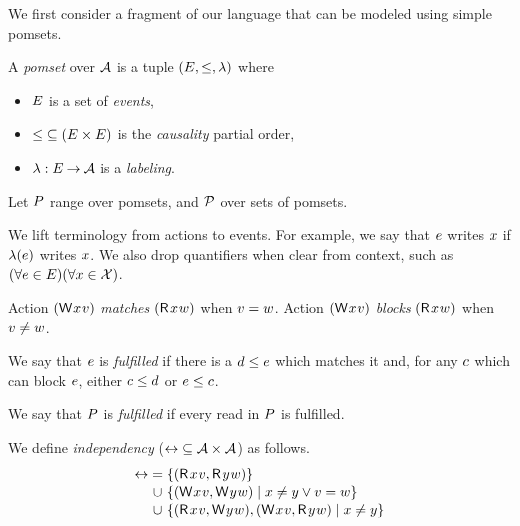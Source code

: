 We first consider a fragment of our language that can be modeled using simple
pomsets.
\begin{definition}
  A \emph{pomset} over $\mathcal{A}$ is a tuple
  $(E, {\le}, \lambda)$ where
  \begin{itemize}
  \item $E$ is a set of \emph{events},
  \item
    ${\le} \subseteq (E\times E)$ is the \emph{causality} partial order, 
  \item
    $\lambda: E \mathbin\rightarrow \mathcal{A}$ is a \emph{labeling}.
  \end{itemize}
\end{definition}
Let $P$ range over pomsets, and $\mathcal{P}$ over sets of pomsets.

We lift terminology from actions to events.  For example, we say that $e$
writes $x$ if $\lambda(e)$ writes $x$.  We also drop quantifiers
when clear from context, such as
$(\forall e\in E)(\forall x\in\mathcal{X})$.

\begin{definition}
  Action $\DWP{\aLoc}{\aVal}$ \emph{matches} $\DRP{\aLoc}{\bVal}$ when $v=w$.
  Action $\DWP{\aLoc}{\aVal}$ \emph{blocks} $\DRP{\aLoc}{\bVal}$ when $v\neq w$.
  

  We say that $e$ is \emph{fulfilled} if there is a $d\le e$ which
  matches it and, for any $c$ which can block $e$, either $c\le d$
  or $e\le c$.

  We say that $P$ is \emph{fulfilled} if every read in $P$ is fulfilled.

  We define \emph{independency} (${\mathrel\leftrightarrow}\subseteq\mathcal{A}\times\mathcal{A}$) as follows.
  \begin{align*}
    \reorder &=
    \{(\DR{\aLoc}{\aVal}, \DR{\bLoc}{\bVal}) \}
    \\[-.5ex]&\mkern2mu\cup\mkern2mu
    \{(\DW{\aLoc}{\aVal}, \DW{\bLoc}{\bVal}) \mid \aLoc\neq\bLoc \lor \aVal=\bVal\}
    \\[-.5ex]&\mkern2mu\cup\mkern2mu
    \{(\DR{\aLoc}{\aVal}, \DW{\bLoc}{\bVal}), (\DW{\aLoc}{\aVal}, \DR{\bLoc}{\bVal}) \mid \aLoc\neq\bLoc\}
  \end{align*}
\end{definition}

